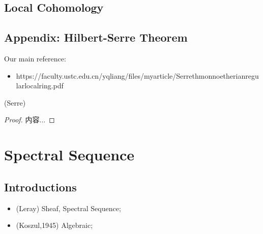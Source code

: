 \documentclass[Total.tex]{subfiles}
\begin{document}
		\section{Local Cohomology}
		\section{Appendix: Hilbert-Serre Theorem}
			Our main reference:
			\begin{itemize}
				\item https://faculty.ustc.edu.cn/yqliang/files/myarticle/Serrethmonnoetherianregularlocalring.pdf
			\end{itemize}
			
			\begin{theorem}
				(Serre)
			\end{theorem}
			\begin{proof}
				内容...
			\end{proof}
	\chapter{Spectral Sequence}
		\section{Introductions}
			\begin{itemize}
				\item (Leray) Sheaf, Spectral Sequence;
				\item (Koszul,1945) Algebraic;
			\end{itemize}
\end{document}

